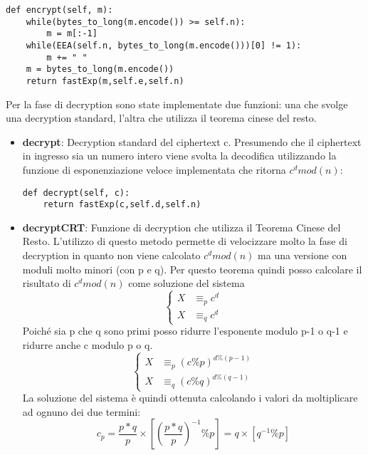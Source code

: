 \documentclass{article}
\begin{document}
\begin{enumerate}
    \begin{lstlisting}
def encrypt(self, m):
    while(bytes_to_long(m.encode()) >= self.n):
        m = m[:-1]
    while(EEA(self.n, bytes_to_long(m.encode()))[0] != 1):
        m += " "
    m = bytes_to_long(m.encode())
    return fastExp(m,self.e,self.n)
    \end{lstlisting}
    Per la fase di decryption sono state implementate due funzioni: una che svolge una decryption standard, l'altra che utilizza il teorema cinese del resto.
    \begin{itemize}
        \item \textbf{decrypt}: Decryption standard del ciphertext c. Presumendo che il ciphertext in ingresso sia un numero intero viene svolta la decodifica utilizzando la funzione di esponenziazione veloce implementata che ritorna $c^d mod(n)$:
        \begin{lstlisting}
def decrypt(self, c):
    return fastExp(c,self.d,self.n)
        \end{lstlisting}
        \item \textbf{decryptCRT}: Funzione di decryption che utilizza il Teorema Cinese del Resto. L'utilizzo di questo metodo permette di velocizzare molto la fase di decryption in quanto non viene calcolato $c^d mod(n)$ ma una versione con moduli molto minori (con p e q). Per questo teorema quindi posso calcolare il risultato di $c^d mod(n)$ come soluzione del sistema
        \begin{equation}
        \begin{cases}
            X &\equiv_p c^d \\
            X &\equiv_q c^d
        \end{cases}
        \end{equation}
        Poiché sia p che q sono primi posso ridurre l'esponente modulo p-1 o q-1 e ridurre anche c modulo p o q.
        \begin{equation}
        \begin{cases}
            X &\equiv_p (c\%p)^{d\%(p-1)}\\
            X &\equiv_q (c\%q)^{d\%(q-1)}
        \end{cases}
        \end{equation}
        La soluzione del sistema è quindi ottenuta calcolando i valori da moltiplicare ad ognuno dei due termini:
        \begin{equation}
            c_p = \frac{p*q}{p} \times \left[\left(\frac{p*q}{p}\right)^{-1} \% p\right] = q \times [q^{-1} \% p]

\end{equation}
\end{itemize}
\end{enumerate}
\end{document}
